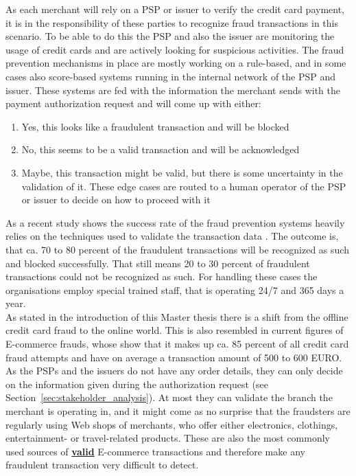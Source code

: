 As each merchant will rely on a \gls{PSP} or issuer to verify the credit card payment, it is in the responsibility of these parties to recognize fraud transactions in this scenario. To be able to do this the \gls{PSP} and also the issuer are monitoring the usage of credit cards and are actively looking for suspicious activities. The fraud prevention mechanisms in place are mostly working on a rule-based, and in some cases also score-based systems running in the internal network of the \gls{PSP} and issuer. These systems are fed with the information the merchant sends with the payment authorization request and will come up with either:\@

\begin{enumerate}
  \item Yes, this looks like a fraudulent transaction and will be blocked
  \item No, this seems to be a valid transaction and will be acknowledged
  \item Maybe, this transaction might be valid, but there is some uncertainty in the validation of it. These edge cases are routed to a human operator of the \gls{PSP} or issuer to decide on how to proceed with it
\end{enumerate}

As a recent study shows the success rate of the fraud prevention systems heavily relies on the techniques used to validate the transaction data \citep{rana2015survey}. The outcome is, that ca. 70 to 80 percent of the fraudulent transactions will be recognized as such and blocked successfully. That still means 20 to 30 percent of fraudulent transactions could not be recognized as such. For handling these cases the organisations employ special trained staff, that is operating 24/7 and 365 days a year. \\

As stated in the introduction of this Master thesis there is a shift from the offline credit card fraud to the online world. This is also resembled in current figures of E-commerce frauds, whose show that it makes up ca. 85 percent of all credit card fraud attempts and have on average a transaction amount of 500 to 600 EURO.\\

As the \gls{PSP}s and the issuers do not have any order details, they can only decide on the information given during the authorization request (see Section~\ref{sec:stakeholder_analysis}). At most they can validate the branch the merchant is operating in, and it might come as no surprise that the fraudsters are regularly using Web shops of merchants, who offer either electronics, clothings, entertainment- or travel-related products. These are also the most commonly used sources of \textbf{\underline{valid}} E-commerce transactions and therefore make any fraudulent transaction very difficult to detect. \\

